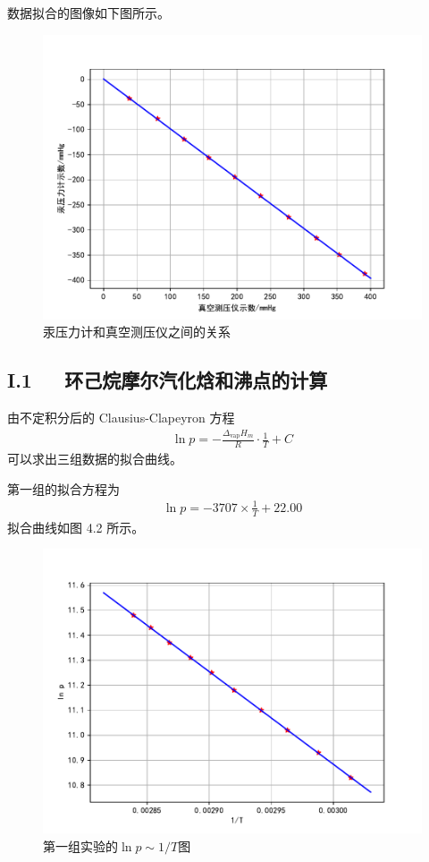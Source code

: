 \documentclass[12pt]{ctexart}
\numberwithin{equation}{section}
\begin{document}
数据拟合的图像如下图所示。
\begin{figure}[!h]
    \centering
    \includegraphics[scale=0.8]{gongzuoquxian.pdf}
    \caption{汞压力计和真空测压仪之间的关系}
\end{figure}

\subsection*{I.1~~~环己烷摩尔汽化焓和沸点的计算}
由不定积分后的 Clausius-Clapeyron 方程
\begin{align}
    \ln p = -\frac{\Delta_{\text{vap}}H_m}{R}
        \cdot\frac{1}{T} + C
    \tag*{(I.2)}
\end{align}
可以求出三组数据的拟合曲线。

第一组的拟合方程为
\begin{align}
    \ln p = -3707 \times \frac{1}{T} + 22.00
    \tag*{(I.3)}
\end{align}
拟合曲线如图 4.2 所示。
\begin{figure}[!h]
    \centering
    \includegraphics[scale=0.8]{nihe_1.pdf}
    \caption{第一组实验的$\ln p \sim 1/T$图}
\end{figure}
\end{document}
